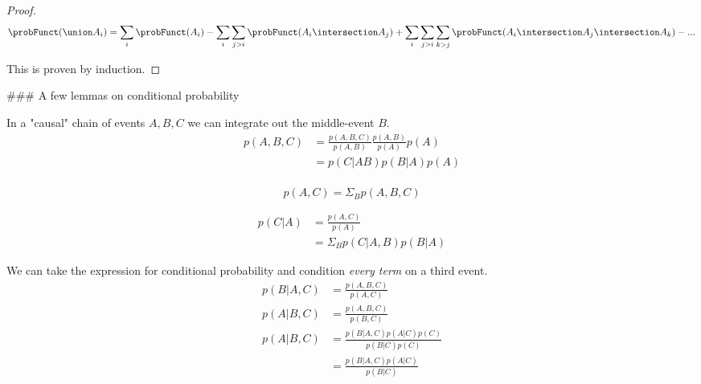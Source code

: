 \begin{proof}
    $$ \probFunct (\union A_i) = \sum_i \probFunct(A_i) 
            - \sum_i \sum_{j>i} \probFunct(A_i \intersection A_j) 
            + \sum_i \sum_{j>i} \sum_{k>j} \probFunct(A_i \intersection A_j \intersection A_k) 
            - ...  $$
    
    This is proven by induction. 
                
    
    
\end{proof}

### A few lemmas on conditional probability \label{condPropLemmas}

In a "causal" chain of events $A, B, C$ we can integrate out the middle-event $B$.
\begin{equation}
    \begin{aligned}
        p(A, B, C)  &= \frac{p(A, B, C)}{p(A, B)} \frac{p(A, B)}{p(A)} p(A) \\
                    &= p(C|AB) p(B|A) p(A) \\
    \end{aligned}
\end{equation}

\begin{equation}
    p(A, C) = \Sigma_B p(A, B, C)
\end{equation}

\begin{equation}
    \begin{aligned}
            p(C | A) &= \frac{p(A, C)}{p(A)} \\
                     &= \Sigma_B p(C|A, B) p(B|A)
    \end{aligned}
\end{equation}

We can take the expression for conditional probability and condition \emph{every term} on a third event.
\begin{equation}
    \begin{aligned}
        p(B|A, C) &= \frac{p(A, B, C)}{p(A, C)} \\
        p(A|B, C) &= \frac{p(A, B, C)}{p(B, C)} \\
        p(A|B, C) &= \frac{p(B|A, C) p(A|C) p(C)}{p(B|C)p(C)} \\
                  &= \frac{p(B|A, C) p(A|C)}{p(B|C)} \\
    \end{aligned}
\end{equation}


